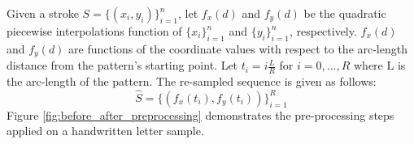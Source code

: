 \iftoggle{edit-mode}{\hspace{0pt}\marginpar{Approach}}{}
Given a stroke $S=\{(x_i,y_i)\}_{i=1}^{n}$, let $f_{x}(d)$ and $f_{y}(d)$ be the quadratic piecewise interpolations function of $\{x_i\}_{i=1}^{n}$ and $\{y_i\}_{i=1}^{n}$, respectively. 
$f_{x}(d)$ and $f_{y}(d)$ are functions of the coordinate values with respect to the arc-length distance from the pattern's starting point. 
Let $t_i=i\frac{L}{R}$ for $i=0,...,R$ where L is the arc-length of the pattern.
The re-sampled sequence is given as follows:
\begin{equation}
\widehat{S}=\{(f_x(t_i),f_y(t_i))\}_{i=1}^{R}
\end{equation}
Figure \ref{fig:before_after_preprocessing} demonstrates the pre-processing steps applied on a handwritten letter sample.

